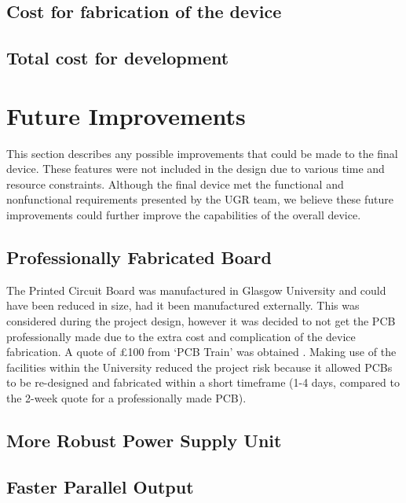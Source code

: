\documentclass[a4paper,12pt]{article}
\begin{document}
\subsection{Cost for fabrication of the device}
\label{sec:device_cost}

\subsection{Total cost for development}
\label{sec:total_cost}


\newpage
\section{Future Improvements}
\label{sec:future_improvements}

This section describes any possible improvements that could be made to the final device. These features were not included in the design due to various time and resource constraints. Although the final device met the functional and nonfunctional requirements presented by the UGR team, we believe these future improvements could further improve the capabilities of the overall device.

\subsection{Professionally Fabricated Board}
\label{sec:future_improvement_1}

The Printed Circuit Board was manufactured in Glasgow University and could have been reduced in size, had it been manufactured externally. This was considered during the project design, however it was decided to not get the PCB professionally made due to the extra cost and complication of the device fabrication. A quote of £100 from ‘PCB Train’ was obtained \cite{pcb_train}. Making use of the facilities within the University reduced the project risk because it allowed PCBs to be re-designed and fabricated within a short timeframe (1-4 days, compared to the 2-week quote for a professionally made PCB).

\subsection{More Robust Power Supply Unit}
\label{sec:future_improvement_2}

\subsection{Faster Parallel Output}
\label{sec:future_improvement_3}
\end{document}
